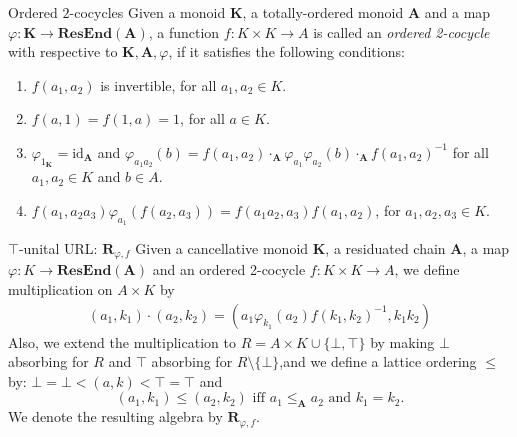 \documentclass[professionalfont, handout, 10pt]{beamer} %
\theoremstyle{plain}
\theoremstyle{definition}
\newcommand{\m}[1]{{\mathbf {#1} }}
\begin{document}
\begin{frame}{Ordered $2$-cocycles}
    Given a monoid $\mathbf{K}$, a totally-ordered monoid $\mathbf{A}$ and a map $\varphi: \mathbf{K} \rightarrow \m {ResEnd}(\mathbf{A})$, a function $f: K \times K \rightarrow A$ is called an \emph{ordered 2-cocycle} with respective to $\m K, \m A, \varphi$, if it satisfies the following conditions:
    \begin{enumerate}
    \item $f(a_1, a_2)$ is invertible, for all $a_1, a_2 \in K$.

    \item $f(a, 1) = f(1,a)= 1$, for all $a \in K$.

    \item $\varphi_{1_{\mathbf{K}}} = \text{id}_{\mathbf{A}}$ and $\varphi_{a_1 a_2} (b) = f(a_1, a_2) \cdot_{\mathbf{A}} \varphi_{a_1} \varphi_{a_2} (b) \cdot_{\mathbf{A}} f(a_1, a_2)^{-1}$ for all $a_1, a_2 \in K$ and $b \in A$.
    
    \item $f(a_1, a_2 a_3) \varphi_{a_1}(f(a_2, a_3)) = f(a_1 a_2, a_3) f(a_1, a_2)$, for $a_1, a_2, a_3 \in K$.
    \end{enumerate}
\end{frame}

\begin{frame}{$\top$-unital URL: $\m R_{\varphi, f}$}
    Given a cancellative monoid $\mathbf{K}$, a residuated chain $\mathbf{A}$, a map $\varphi: K \rightarrow \m {ResEnd}(\mathbf{A})$ and an ordered 2-cocycle $f: K \times K \rightarrow A$, we  define multiplication on $A \times K$ by 
    \begin{align*}
    (a_1, k_1) \cdot (a_2, k_2) = (a_1 \varphi_{k_1} (a_2) f(k_1, k_2)^{-1}, k_1 k_2)
    \end{align*}
    Also, we extend the multiplication to $R = A \times K \cup \{\bot, \top\}$ by making $\bot$ absorbing for $R$ and $\top$ absorbing for $R \setminus\{\bot\}$,and we define a lattice ordering $\leq$ by: $\bot = \bot < (a, k) < \top = \top$ and
    \[
    (a_1, k_1) \leq (a_2, k_2) \text{ iff } a_1 \leq_{\mathbf{A}} a_2 \text{ and } k_1 = k_2.
    \]
    We denote the resulting algebra by $\mathbf{R}_{\varphi, f}$.
\end{frame}
\end{document}
